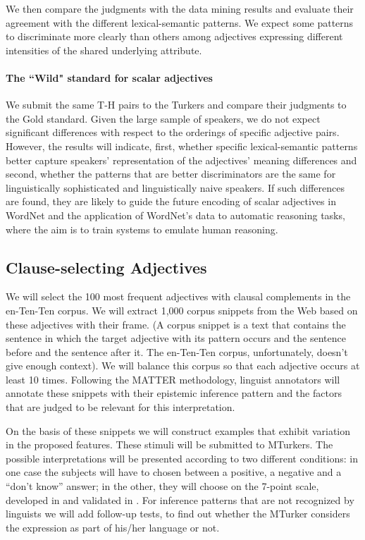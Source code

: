 \documentclass[10pt]{article}
\begin{document}
We then compare the judgments with the data mining results and evaluate their agreement with the different lexical-semantic patterns. 
We expect some patterns to discriminate more clearly than others among adjectives expressing different intensities of the shared underlying attribute. 

\paragraph{The ``Wild" standard for scalar adjectives}
We submit the same T-H pairs to the Turkers and compare their judgments to the Gold standard. Given the large sample 
of speakers, we do not expect significant differences with respect to the orderings of specific adjective pairs. However, 
the results will indicate, first, whether specific lexical-semantic patterns better capture speakers' representation of the adjectives' 
meaning differences and second, whether the patterns that are better discriminators are the same for linguistically 
sophisticated and linguistically naive speakers. If such differences are found, they are likely to guide the future encoding of scalar adjectives 
in WordNet and the application of WordNet's data to automatic reasoning tasks, where the aim is to train systems to emulate human reasoning. 




\subsection{Clause-selecting Adjectives}

We will select the 100 most frequent adjectives with clausal complements in the en-Ten-Ten corpus. We will extract 1,000 corpus snippets from the Web based on these adjectives with their frame. (A corpus snippet is a text that contains the sentence in which the target adjective with its pattern occurs and the sentence before and the sentence after it. The en-Ten-Ten corpus, unfortunately, doesn’t give enough context). We will balance this corpus so that each adjective occurs at least 10 times. Following the MATTER methodology, linguist annotators will annotate these snippets with their epistemic inference pattern and the factors that are judged to be relevant for this interpretation.

On the basis of these snippets we will construct examples that exhibit variation in the proposed features. These stimuli will be submitted to MTurkers. 
The possible interpretations will be presented according to two different conditions: in one case the subjects will have to chosen between a positive, a negative and a ``don’t know'' answer; in the other, they will choose on the 7-point scale, developed in \cite{sauri:2008phd,sauri-pustejovsky2012} and validated in \cite{demarneff+manning+potts:2012}.
For inference patterns that are not recognized by linguists we will add follow-up tests, to find out whether the MTurker considers the expression as part of his/her language or not.
\end{document}
